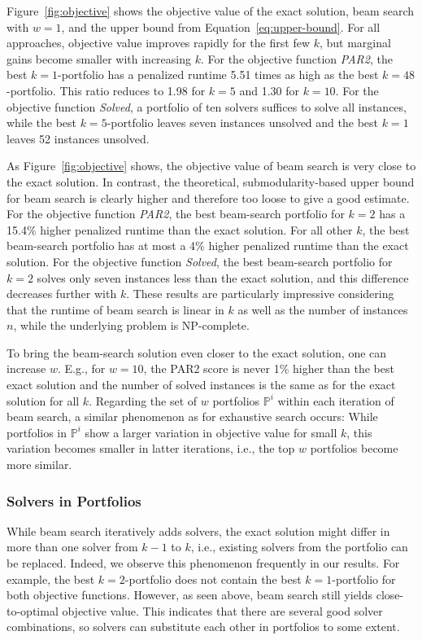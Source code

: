 \documentclass[conference]{IEEEtran}
\begin{document}
Figure~\ref{fig:objective} shows the objective value of the exact solution, beam search with $w=1$, and the upper bound from Equation~\ref{eq:upper-bound}.
For all approaches, objective value improves rapidly for the first few $k$, but marginal gains become smaller with increasing $k$.
For the objective function \emph{PAR2}, the best $k=1$-portfolio has a penalized runtime 5.51 times as high as the best
$k=48$-portfolio.
This ratio reduces to 1.98 for $k=5$ and 1.30 for $k=10$.
For the objective function \emph{Solved}, a portfolio of ten solvers suffices to solve all instances, while the best $k=5$-portfolio leaves seven instances unsolved and the best $k=1$ leaves 52 instances unsolved.

As Figure~\ref{fig:objective} shows, the objective value of beam search is very close to the exact solution.
In contrast, the theoretical, submodularity-based upper bound for beam search is clearly higher and therefore too loose to give a good estimate.
For the objective function \emph{PAR2}, the best beam-search portfolio for $k=2$ has a 15.4\% higher penalized runtime than the exact solution.
For all other $k$, the best beam-search portfolio has at most a 4\% higher penalized runtime than the exact solution.
For the objective function \emph{Solved}, the best beam-search portfolio for $k=2$ solves only seven instances less than the exact solution, and this difference decreases further with $k$.
These results are particularly impressive considering that the runtime of beam search is linear in $k$ as well as the number of instances $n$, while the underlying problem is NP-complete.

To bring the beam-search solution even closer to the exact solution, one can increase $w$.
E.g., for $w=10$, the PAR2 score is never 1\% higher than the best exact solution and the number of solved instances is the same as for the exact solution for all $k$.
Regarding the set of $w$ portfolios $\mathbb{P}^i$ within each iteration of beam search, a similar phenomenon as for exhaustive search occurs:
While portfolios in $\mathbb{P}^i$ show a larger variation in objective value for small $k$, this variation becomes smaller in latter iterations, i.e., the top $w$ portfolios become more similar.

\subsubsection{Solvers in Portfolios}

While beam search iteratively adds solvers, the exact solution might differ in more than one solver from $k-1$ to $k$, i.e., existing solvers from the portfolio can be replaced.
Indeed, we observe this phenomenon frequently in our results.
For example, the best $k=2$-portfolio does not contain the best $k=1$-portfolio for both objective functions.
However, as seen above, beam search still yields close-to-optimal objective value.
This indicates that there are several good solver combinations, so solvers can substitute each other in portfolios to some extent.
\end{document}
